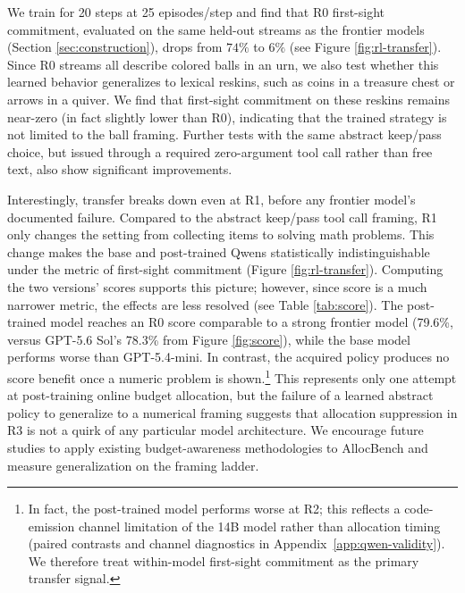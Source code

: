 \documentclass{article}
\begin{document}
We train for 20 steps at 25 episodes/step and find that R0 first-sight commitment, evaluated on the same held-out streams as the frontier models (Section \ref{sec:construction}), drops from $74\%$ to $6\%$ (see Figure \ref{fig:rl-transfer}). Since R0 streams all describe colored balls in an urn, we also test whether this learned behavior generalizes to lexical reskins, such as coins in a treasure chest or arrows in a quiver. We find that first-sight commitment on these reskins remains near-zero (in fact slightly lower than R0), indicating that the trained strategy is not limited to the ball framing. Further tests with the same abstract keep/pass choice, but issued through a required zero-argument tool call rather than free text, also show significant improvements.

Interestingly, transfer breaks down even at R1, before any frontier model's documented failure. Compared to the abstract keep/pass tool call framing, R1 only changes the setting from collecting items to solving math problems. This change makes the base and post-trained Qwens statistically indistinguishable under the metric of first-sight commitment (Figure \ref{fig:rl-transfer}). Computing the two versions' scores supports this picture; however, since score is a much narrower metric, the effects are less resolved (see Table \ref{tab:score}). The post-trained model reaches an R0 score comparable to a strong frontier model (79.6\%, versus GPT-5.6 Sol's 78.3\% from Figure \ref{fig:score}), while the base model performs worse than GPT-5.4-mini. In contrast, the acquired policy produces no score benefit once a numeric problem is shown.\footnote{In fact, the post-trained model performs worse at R2; this reflects a code-emission channel limitation of the 14B model rather than allocation timing (paired contrasts and channel diagnostics in Appendix~\ref{app:qwen-validity}). We therefore treat within-model first-sight commitment as the primary transfer signal.} This represents only one attempt at post-training online budget allocation, but the failure of a learned abstract policy to generalize to a numerical framing suggests that allocation suppression in R3 is not a quirk of any particular model architecture. We encourage future studies to apply existing budget-awareness methodologies \citep{liu2025budgetaware, liu2026intent, li2026bavt, lin2026bagen} to AllocBench and measure generalization on the framing ladder.  
\end{document}
